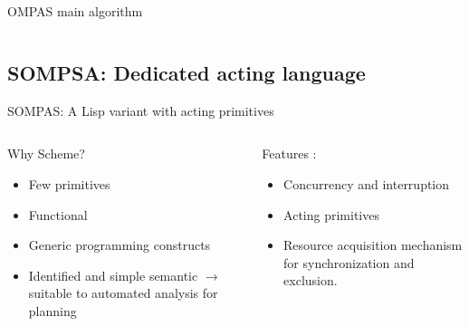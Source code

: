 \begin{frame}{OMPAS main algorithm}
\begin{columns}
\begin{column}{0.6\textwidth}
        \end{column}
    \end{columns}
\end{frame}

\subsection{SOMPSA: Dedicated acting language}

\begin{frame}{SOMPAS: A Lisp variant with acting primitives}
    
    \begin{columns}
        \begin{column}{0.5\textwidth}
            Why Scheme?
            \begin{itemize}
                \item Few primitives
                \item Functional
                \item Generic programming constructs
                \item Identified and simple semantic $\rightarrow$ suitable to automated analysis for planning
            \end{itemize}
        \end{column}
        \begin{column}{0.5\textwidth}
            Features :
            \begin{itemize}
                \item Concurrency and interruption
                \item Acting primitives
                \item Resource acquisition mechanism for synchronization and exclusion.
            \end{itemize}

        \end{column}
    \end{columns}
\end{frame}

